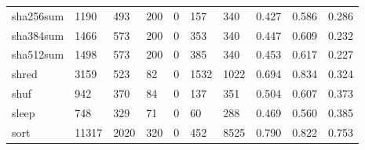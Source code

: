 \begin{longtable}{lp{1.3cm}p{1.3cm}p{1.3cm}p{1.3cm}p{1.3cm}p{1.3cm}p{1.3cm}p{1.3cm}p{1.3cm}}
sha256sum &                   1190 &                                493 &                               200 &                                0 &                               157 &                             340 &                                0.427 &                                  0.586 &                                0.286 \\
sha384sum &                   1466 &                                573 &                               200 &                                0 &                               353 &                             340 &                                0.447 &                                  0.609 &                                0.232 \\
sha512sum &                   1498 &                                573 &                               200 &                                0 &                               385 &                             340 &                                0.453 &                                  0.617 &                                0.227 \\
shred     &                   3159 &                                523 &                                82 &                                0 &                              1532 &                            1022 &                                0.694 &                                  0.834 &                                0.324 \\
shuf      &                    942 &                                370 &                                84 &                                0 &                               137 &                             351 &                                0.504 &                                  0.607 &                                0.373 \\
sleep     &                    748 &                                329 &                                71 &                                0 &                                60 &                             288 &                                0.469 &                                  0.560 &                                0.385 \\
sort      &                  11317 &                               2020 &                               320 &                                0 &                               452 &                            8525 &                                0.790 &                                  0.822 &                                0.753 \\

\end{longtable}
